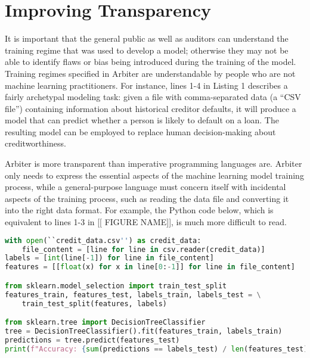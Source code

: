 \documentclass[letterpaper]{article}
\begin{document}
\section{Improving Transparency}	
It is important that the general public as well as auditors can understand the training regime that was used to develop a model; otherwise they may not be able to identify flaws or bias being introduced during the training of the model. Training regimes specified in Arbiter are understandable by people who are not machine learning practitioners. For instance, lines 1-4 in  Listing 1 describes a fairly archetypal modeling task: given a file with comma-separated data (a ``CSV file”) containing information about historical creditor defaults, it will produce a model that can predict whether a person is likely to default on a loan. The resulting model can be employed to replace human decision-making about creditworthiness.

Arbiter is more transparent than imperative programming languages are. Arbiter only needs to express the essential aspects of the machine learning model training process, while a general-purpose language must concern itself with incidental aspects of the training process, such as reading the data file and converting it into the right data format. For example, the Python code below, which is equivalent to lines 1-3 in [[ FIGURE NAME]], is much more difficult to read.

\begin{lstlisting}[language=Python,caption=Python code equivalent to Listing 1]
with open(``credit_data.csv'') as credit_data:
    file_content = [line for line in csv.reader(credit_data)]
labels = [int(line[-1]) for line in file_content]
features = [[float(x) for x in line[0:-1]] for line in file_content]

from sklearn.model_selection import train_test_split
features_train, features_test, labels_train, labels_test = \
    train_test_split(features, labels)

from sklearn.tree import DecisionTreeClassifier
tree = DecisionTreeClassifier().fit(features_train, labels_train)
predictions = tree.predict(features_test)
print(f"Accuracy: {sum(predictions == labels_test) / len(features_test)}")
\end{lstlisting}
\end{document}

